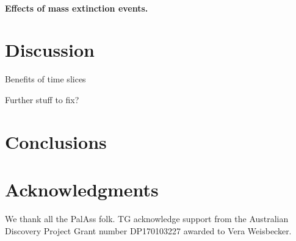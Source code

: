 \documentclass[12pt,a4paper]{article}
\begin{document}
\paragraph{Effects of mass extinction events.}



	


	

\section{Discussion}

Benefits of time slices

Further stuff to fix?



\section{Conclusions}
	

\section{Acknowledgments}
	We thank all the PalAss folk.
  TG acknowledge support from the Australian Discovery Project Grant number DP170103227 awarded to Vera Weisbecker.
	
 
 
\end{document}
